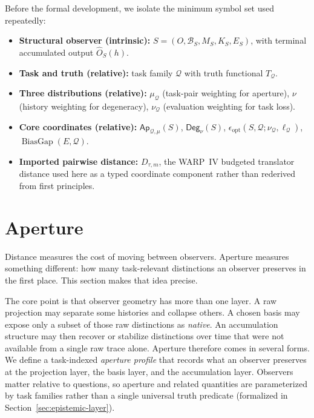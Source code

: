 \documentclass[11pt,twoside]{article}
\theoremstyle{definition}
\DeclareMathOperator{\BiasGap}{BiasGap}
\begin{document}
Before the formal development, we isolate the minimum symbol set used repeatedly:
\begin{itemize}[leftmargin=*]
  \item \textbf{Structural observer (intrinsic):} \(S=(O,\mathcal{B}_S,M_S,K_S,E_S)\), with terminal accumulated output \(\widehat{O}_S(h)\).
  \item \textbf{Task and truth (relative):} task family \(\mathcal{Q}\) with truth functional \(T_{\mathcal{Q}}\).
  \item \textbf{Three distributions (relative):}
        \(\mu_{\mathcal{Q}}\) (task-pair weighting for aperture),
        \(\nu\) (history weighting for degeneracy),
        \(\nu_{\mathcal{Q}}\) (evaluation weighting for task loss).
  \item \textbf{Core coordinates (relative):}
        \(\mathsf{Ap}_{\mathcal{Q},\mu}(S)\),
        \(\mathsf{Deg}_{\nu}(S)\),
        \(\epsilon_{\mathrm{opt}}(S,\mathcal{Q};\nu_{\mathcal{Q}},\ell_{\mathcal{Q}})\),
        \(\BiasGap(E,\mathcal{Q})\).
  \item \textbf{Imported pairwise distance:}
        \(D_{\tau,m}\), the WARP~IV budgeted translator distance used here as a typed coordinate component rather than rederived from first principles.
\end{itemize}

\section{Aperture}
\label{sec:aperture}

Distance measures the cost of moving between observers. Aperture measures something different: how many task-relevant distinctions an observer preserves in the first place. This section makes that idea precise.

The core point is that observer geometry has more than one layer. A raw projection may separate some histories and collapse others. A chosen basis may expose only a subset of those raw distinctions as \emph{native}. An accumulation structure may then recover or stabilize distinctions over time that were not available from a single raw trace alone. Aperture therefore comes in several forms. We define a task-indexed \emph{aperture profile} that records what an observer preserves at the projection layer, the basis layer, and the accumulation layer.
Observers matter relative to questions, so aperture and related quantities are parameterized by task families rather than a single universal truth predicate (formalized in Section~\ref{sec:epistemic-layer}).
\end{document}

